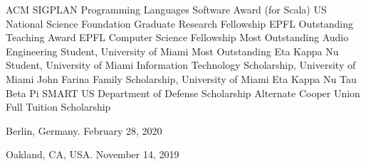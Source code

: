 \documentclass[9pt]{article}
\begin{document}
\noindent ACM SIGPLAN Programming Languages Software Award (for Scala) 
\newline\noindent US National Science Foundation Graduate Research Fellowship 
\newline\noindent EPFL Outstanding Teaching Award 
\newline\noindent EPFL Computer Science Fellowship 
\newline\noindent Most Outstanding Audio Engineering Student, University of Miami 
\newline\noindent Most Outstanding Eta Kappa Nu Student, University of Miami 
\newline\noindent Information Technology Scholarship, University of Miami 
\newline\noindent John Farina Family Scholarship, University of Miami 
\newline\noindent Eta Kappa Nu 
\newline\noindent Tau Beta Pi 
\newline\noindent SMART US Department of Defense Scholarship Alternate 
\newline\noindent Cooper Union Full Tuition Scholarship 

\bigskip


\medskip
{}

\vspace{-0.03in}
\linebreak\noindent Berlin, Germany. February 28, 2020 
\bigskip

\vspace{-0.02in}
 \vspace{-0.03in} 
\newline{}\vspace{-0.03in}
\newline{}\dates{} \vspace{-0.03in}
\linebreak\noindent Oakland, CA, USA. November 14, 2019
\bigskip
\end{document}
